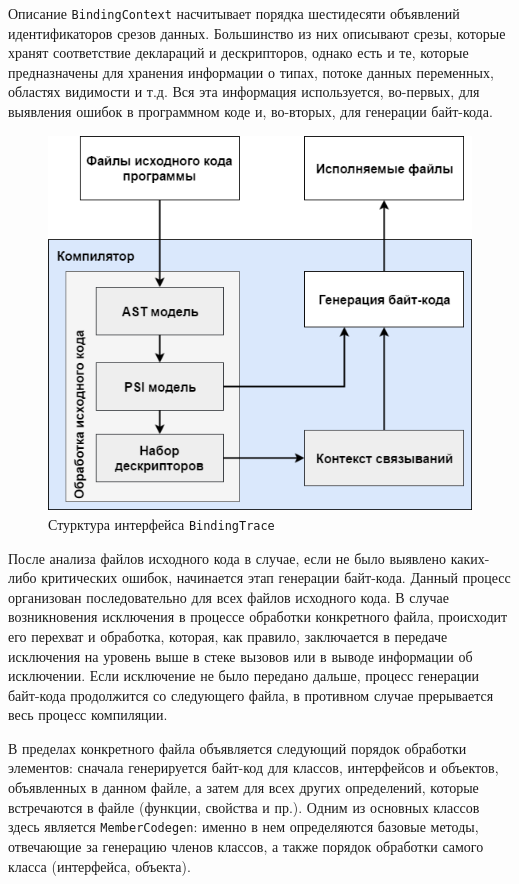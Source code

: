 Описание \lstinline{BindingContext} насчитывает порядка шестидесяти объявлений идентификаторов срезов данных. Большинство из них описывают срезы, которые хранят соответствие деклараций и дескрипторов, однако есть и те, которые предназначены для хранения информации о типах, потоке данных переменных, областях видимости и т.д. Вся эта информация используется, во-первых, для выявления ошибок в программном коде и, во-вторых, для генерации байт-кода.

\begin{figure}[htbp]
    \centering
    \includegraphics[width=\textwidth]{resources/06/04_compiler_flow_diagram.png}
    \caption{Стурктура интерфейса \lstinline{BindingTrace}}
    \label{fig05:binding-trace-scheme}
\end{figure}

После анализа файлов исходного кода в случае, если не было выявлено каких-либо критических ошибок, начинается этап генерации байт-кода. Данный процесс организован последовательно для всех файлов исходного кода. В случае возникновения исключения в процессе обработки конкретного файла, происходит его перехват и обработка, которая, как правило, заключается в передаче исключения на уровень выше в стеке вызовов или в выводе информации об исключении. Если исключение не было передано дальше, процесс генерации байт-кода продолжится со следующего файла, в противном случае прерывается весь процесс компиляции.  

В пределах конкретного файла объявляется следующий порядок обработки элементов: сначала генерируется байт-код для классов, интерфейсов и объектов, объявленных в данном файле, а затем для всех других определений, которые встречаются в файле (функции, свойства и пр.). Одним из основных классов здесь является \lstinline{MemberCodegen}: именно в нем определяются базовые методы, отвечающие за генерацию членов классов, а также порядок обработки самого класса (интерфейса, объекта). 

